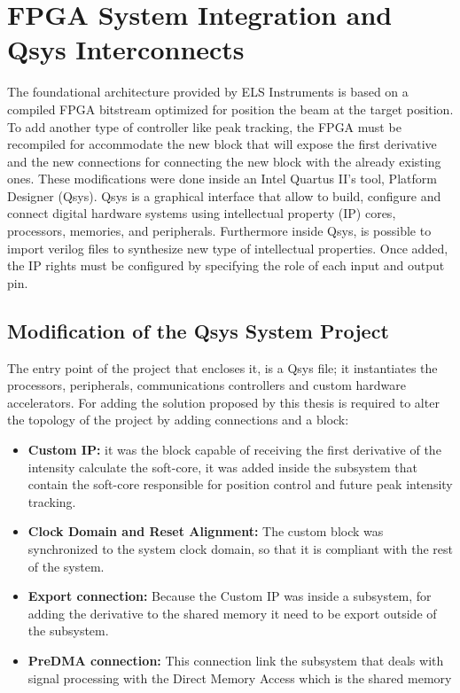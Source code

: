\section{FPGA System Integration and Qsys Interconnects}
\label{subsec:fpga_qsys_integration}

The foundational architecture provided by ELS Instruments is based on a compiled FPGA bitstream optimized for position the beam at the target position. 
To add another type of controller like peak tracking, the FPGA must be recompiled for accommodate the new block that will expose the first derivative and the new connections for connecting the new block with the already existing ones.
These modifications were done inside an Intel Quartus II's tool, Platform Designer (Qsys).
Qsys is a graphical interface that allow to build, configure and connect digital hardware systems using intellectual property (IP) cores, processors, memories, and peripherals.
Furthermore inside Qsys, is possible to import verilog files to synthesize new type of intellectual properties.
Once added, the IP rights must be configured by specifying the role of each input and output pin.

\subsection{Modification of the Qsys System Project}

The entry point of the project that encloses it, is a Qsys file; it instantiates the processors, peripherals, communications controllers and custom hardware accelerators.
For adding the solution proposed by this thesis is required to alter the topology of the project by adding connections and a block:
\begin{itemize}
    \item \textbf{Custom IP:} it was the block capable of receiving the first derivative of the intensity calculate the soft-core, it was added inside the subsystem that contain the soft-core responsible for position control and future peak intensity tracking.
    \item \textbf{Clock Domain and Reset Alignment:} The custom block was synchronized to the system clock domain, so that it is compliant with the rest of the system.
    \item \textbf{Export connection:} Because the Custom IP was inside a subsystem, for adding the derivative to the shared memory it need to be export outside of the subsystem.
    \item \textbf{PreDMA connection:} This connection link the subsystem that deals with signal processing with the Direct Memory Access which is the shared memory
\end{itemize}

